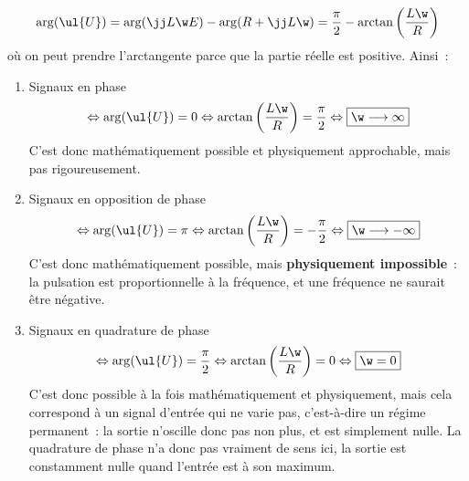 \documentclass[a4paper, 12pt, final, garamond]{book}
\begin{document}
\begin{enumerate}
        \begin{gather*}
            \arg(\ul{U})
                = \arg(\jj L\w E) - \arg(R + \jj L \w)
                = \frac{\pi}{2} - \arctan \left( \frac{L\w}{R} \right)
        \end{gather*}
        où on peut prendre l'arctangente parce que la partie réelle est
        positive. Ainsi~:
        \begin{enumerate}
            \item Signaux en phase
                \begin{gather*}
                    \Leftrightarrow
                    \arg(\ul{U}) = 0
                    \Leftrightarrow
                    \arctan \left( \frac{L\w}{R} \right) = \frac{\pi}{2}
                    \Leftrightarrow
                    \boxed{\w \longrightarrow \infty}
                \end{gather*}
                C'est donc mathématiquement possible et physiquement
                approchable, mais pas rigoureusement.
            \item Signaux en opposition de phase
                \begin{gather*}
                    \Leftrightarrow
                    \arg(\ul{U}) = \pi
                    \Leftrightarrow
                    \arctan \left( \frac{L\w}{R} \right) = -\frac{\pi}{2}
                    \Leftrightarrow
                    \boxed{\w \longrightarrow -\infty}
                \end{gather*}
                C'est donc mathématiquement possible, mais \textbf{physiquement
                impossible}~: la pulsation est proportionnelle à la fréquence,
                et une fréquence ne saurait être négative.
            \item Signaux en quadrature de phase
                \begin{gather*}
                    \Leftrightarrow
                    \arg(\ul{U}) = \frac{\pi}{2}
                    \Leftrightarrow
                    \arctan \left( \frac{L\w}{R} \right) = 0
                    \Leftrightarrow
                    \boxed{\w = 0}
                \end{gather*}
                C'est donc possible à la fois mathématiquement et physiquement,
                mais cela correspond à un signal d'entrée qui ne varie pas,
                c'est-à-dire un régime permanent~: la sortie n'oscille donc pas
                non plus, et est simplement nulle. La quadrature de phase n'a
                donc pas vraiment de sens ici, la sortie est constamment nulle
                quand l'entrée est à son maximum.
        \end{enumerate}
\end{enumerate}
\end{document}
